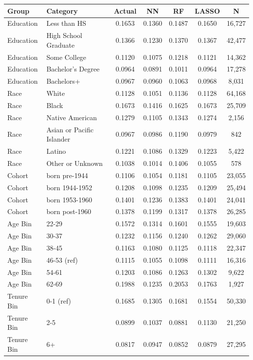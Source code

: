 \begin{tabular}{llccccc}
\hline\hline
Group & Category & Actual & NN & RF & LASSO & N \\
\hline
Education&Less than HS&0.1653&0.1360&0.1487&0.1650&16,727\\
Education&High School Graduate&0.1366&0.1230&0.1370&0.1367&42,477\\
Education&Some College&0.1120&0.1075&0.1218&0.1121&14,362\\
Education&Bachelor's Degree&0.0964&0.0891&0.1011&0.0964&17,278\\
Education&Bachelors+&0.0967&0.0960&0.1063&0.0968&8,031\\
Race&White&0.1128&0.1051&0.1136&0.1128&64,168\\
Race&Black&0.1673&0.1416&0.1625&0.1673&25,709\\
Race&Native American&0.1279&0.1105&0.1343&0.1274&2,156\\
Race&Asian or Pacific Islander&0.0967&0.0986&0.1190&0.0979&842\\
Race&Latino&0.1221&0.1086&0.1329&0.1223&5,422\\
Race&Other or Unknown&0.1038&0.1014&0.1406&0.1055&578\\
Cohort&born pre-1944&0.1106&0.1054&0.1181&0.1105&23,055\\
Cohort&born 1944-1952&0.1208&0.1098&0.1235&0.1209&25,494\\
Cohort&born 1953-1960&0.1401&0.1236&0.1383&0.1401&24,041\\
Cohort&born post-1960&0.1378&0.1199&0.1317&0.1378&26,285\\
Age Bin&22-29&0.1572&0.1314&0.1601&0.1555&19,603\\
Age Bin&30-37&0.1232&0.1156&0.1240&0.1262&29,060\\
Age Bin&38-45&0.1163&0.1080&0.1125&0.1118&22,347\\
Age Bin&46-53 (ref)&0.1115&0.1055&0.1098&0.1111&16,316\\
Age Bin&54-61&0.1203&0.1086&0.1263&0.1302&9,622\\
Age Bin&62-69&0.1988&0.1235&0.2053&0.1763&1,927\\
Tenure Bin&0-1 (ref)&0.1685&0.1305&0.1681&0.1554&50,330\\
Tenure Bin&2-5&0.0899&0.1037&0.0881&0.1130&21,250\\
Tenure Bin&6+&0.0817&0.0947&0.0852&0.0879&27,295\\
\hline\hline
\end{tabular}
